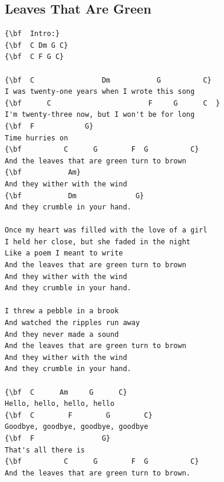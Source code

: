 \documentclass[a4paper]{article}
\begin{document}
\subsection{Leaves That Are Green}
\begin{Verbatim}[commandchars=\\\{\}]
{\bf  Intro:}
{\bf  C Dm G C}
{\bf  C F G C}

{\bf  C                Dm           G          C}
I was twenty-one years when I wrote this song
{\bf      C                       F     G      C  }
I'm twenty-three now, but I won't be for long
{\bf  F            G}
Time hurries on
{\bf          C      G        F  G          C}
And the leaves that are green turn to brown
{\bf           Am}
And they wither with the wind
{\bf           Dm              G}
And they crumble in your hand.

Once my heart was filled with the love of a girl
I held her close, but she faded in the night
Like a poem I meant to write
And the leaves that are green turn to brown
And they wither with the wind
And they crumble in your hand.

I threw a pebble in a brook
And watched the ripples run away
And they never made a sound
And the leaves that are green turn to brown
And they wither with the wind
And they crumble in your hand.

{\bf  C      Am     G      C}
Hello, hello, hello, hello
{\bf  C        F        G        C}
Goodbye, goodbye, goodbye, goodbye
{\bf  F                G}
That's all there is
{\bf          C      G        F  G          C}
And the leaves that are green turn to brown.

\end{Verbatim}
\newpage
\end{document}
